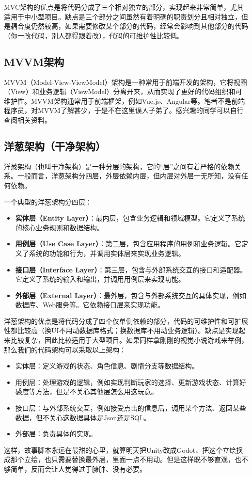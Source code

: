 \documentclass[../main.tex]{subfiles}
\begin{document}
MVC架构的优点是将代码分成了三个相对独立的部分，实现起来非常简单，尤其适用于中小型项目。缺点是三个部分之间虽然有着明确的职责划分且相对独立，但是耦合度仍然较高，如果需要修改某个部分的代码，经常会影响到其他部分的代码（你一改代码，别人都得跟着改），代码的可维护性比较低。

\subsection{MVVM架构}
MVVM（Model-View-ViewModel）架构是一种常用于前端开发的架构，它将视图（View）和业务逻辑（ViewModel）分离开来，从而实现了更好的代码组织和可维护性。MVVM架构通常用于前端框架，例如Vue.js、Angular等。笔者不是前端程序员，对MVVM了解甚少，于是不在这里误人子弟了。感兴趣的同学可以自行查阅相关资料。

\subsection{洋葱架构（干净架构）}

洋葱架构（也叫干净架构）是一种分层的架构，它的“层”之间有着严格的依赖关系。一般而言，洋葱架构分四层，外层依赖内层，但内层对外层一无所知，没有任何依赖。

一个典型的洋葱架构分四层：
\begin{itemize}
  \item \textbf{实体层（Entity Layer）}：最内层，包含业务逻辑和领域模型。它定义了系统的核心业务规则和数据结构。
  \item \textbf{用例层（Use Case Layer）}：第二层，包含应用程序的用例和业务逻辑。它定义了系统的功能和行为，并调用实体层来实现业务逻辑。
  \item \textbf{接口层（Interface Layer）}：第三层，包含与外部系统交互的接口和适配器。它定义了系统的输入和输出，并调用用例层来实现功能。
  \item \textbf{外部层（External Layer）}：最外层，包含与外部系统交互的具体实现，例如数据库、Web服务等。它依赖接口层来实现功能。
\end{itemize}

洋葱架构的优点是将代码分成了四个仅单侧依赖的部分，代码的可维护性和可扩展性都比较高（换UI不用动数据库格式；换数据库不用动业务逻辑）。缺点是实现起来比较复杂，因此比较适用于大型项目。如果同样拿刚刚的视觉小说游戏来举例，那么我们的代码架构可以采取以上架构：
\begin{itemize}
  \item 实体层：定义游戏的状态、角色信息、剧情分支等数据结构。
  \item 用例层：处理游戏的逻辑，例如实现判断玩家的选择、更新游戏状态、计算好感度等方法，但是不关心其他层怎么用这玩意。
  \item 接口层：与外部系统交互，例如接受点击的信息后，调用某个方法、返回某些数据，但不关心这数据具体是Json还是SQL。
  \item 外部层：负责具体的实现。
\end{itemize}
这样，故事脚本永远在最甜的心里，就算明天把Unity改成Godot、把这个立绘换成那个立绘，也只需要替换最外层，里面一点不用动。但是这样既不够直观，也不够简单，反而会让人觉得过于臃肿、没有必要。
\end{document}
